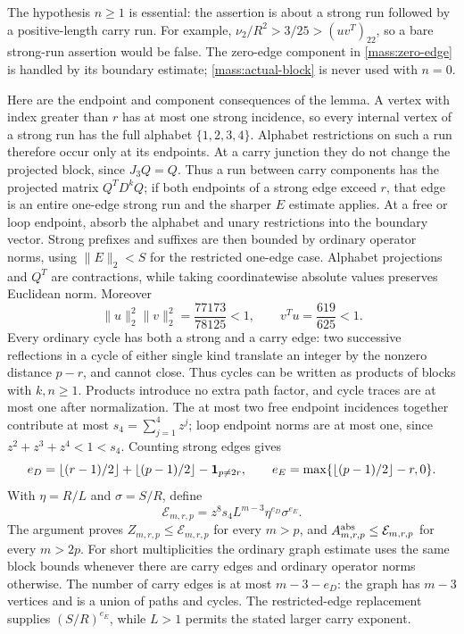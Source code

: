 \documentclass[11pt]{amsart}
\theoremstyle{definition}
\theoremstyle{remark}
\numberwithin{equation}{section}
\begin{document}
The hypothesis $n\ge1$ is essential: the assertion is about a strong
run followed by a positive-length carry run. For example,
$\nu_2/R^2>3/25>(uv^T)_{22}$, so a bare strong-run assertion would
be false. The zero-edge component in \eqref{mass:zero-edge} is handled by its
boundary estimate; \eqref{mass:actual-block} is never used with $n=0$.

Here are the endpoint and component consequences of the lemma. A vertex
with index greater than $r$ has at most one strong incidence, so every
internal vertex of a strong run has the full alphabet $\{1,2,3,4\}$.
Alphabet restrictions on such a run therefore occur only at its endpoints.
At a carry junction they do not change the projected block, since
$J_3Q=Q$. Thus a run between carry components has the projected matrix
$Q^TD^kQ$; if both endpoints of a strong edge exceed $r$, that edge is
an entire one-edge strong run and the sharper $E$ estimate applies.
At a free or loop endpoint, absorb the alphabet and unary restrictions
into the boundary vector. Strong prefixes and suffixes are then bounded
by ordinary operator norms, using $\|E\|_2<S$ for the restricted
one-edge case. Alphabet projections and $Q^T$ are contractions, while
taking coordinatewise absolute values preserves Euclidean norm. Moreover
\[
 \|u\|_2^2\|v\|_2^2=\frac{77173}{78125}<1,\qquad
 v^Tu=\frac{619}{625}<1.
\]
Every ordinary cycle has both a strong and a carry edge: two successive
reflections in a cycle of either single kind translate an integer by the
nonzero distance $p-r$, and cannot close. Thus cycles can be written as
products of blocks with $k,n\ge1$. Products introduce no extra path
factor, and cycle traces are at most one after normalization. The at
most two free endpoint incidences together contribute at most $s_4=\sum_{j=1}^4z^j$; loop endpoint
norms are at most one, since $z^2+z^3+z^4<1<s_4$.
Counting strong edges gives
\[
 e_D=\lfloor(r-1)/2\rfloor+\lfloor(p-1)/2\rfloor
       -{\bf1}_{p\ne2r},\qquad
 e_E=\max\{\lfloor(p-1)/2\rfloor-r,0\}.
\]
With $\eta=R/L$ and $\sigma=S/R$, define
\begin{equation}\label{mass:raw-envelope}
 \mathcal E_{m,r,p}=z^8s_4L^{m-3}\eta^{e_D}\sigma^{e_E}.
\end{equation}
The argument proves $Z_{m,r,p}\le\mathcal E_{m,r,p}$ for every $m>p$,
and $A^{\rm abs}_{m,r,p}\le\mathcal E_{m,r,p}$ for every $m>2p$.
For short multiplicities the ordinary graph estimate uses the same
block bounds whenever there are carry edges and ordinary operator
norms otherwise.
The number of carry edges is at most $m-3-e_D$:
the graph has $m-3$ vertices and is a union of paths and cycles. The
restricted-edge replacement supplies $(S/R)^{e_E}$, while $L>1$
permits the stated larger carry exponent.
\end{document}
